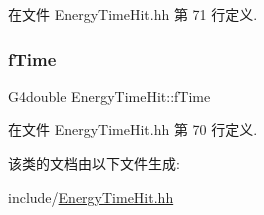 在文件 Energy\+Time\+Hit.\+hh 第 71 行定义.

\mbox{\label{classEnergyTimeHit_a1c7ce3f598d87ae1855d7edb833d4486}} 
\subsubsection{\texorpdfstring{f\+Time}{fTime}}
{\footnotesize\ttfamily G4double Energy\+Time\+Hit\+::f\+Time\hspace{0.3cm}{\ttfamily [private]}}



在文件 Energy\+Time\+Hit.\+hh 第 70 行定义.



该类的文档由以下文件生成\+:\begin{DoxyCompactItemize}
\item 
include/\hyperlink{EnergyTimeHit_8hh}{Energy\+Time\+Hit.\+hh}\end{DoxyCompactItemize}
